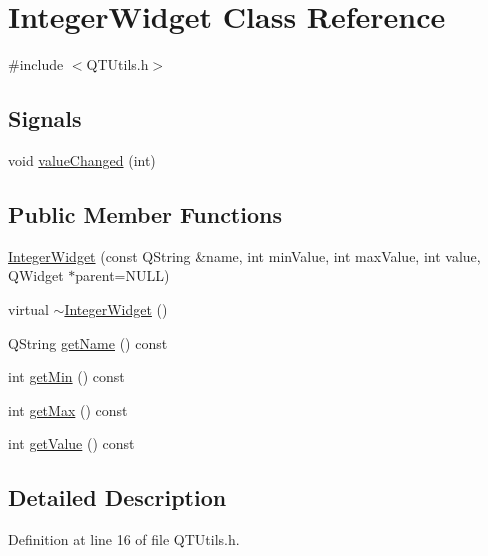\hypertarget{class_integer_widget}{
\section{IntegerWidget Class Reference}
\label{class_integer_widget}
}


{\ttfamily \#include $<$QTUtils.h$>$}

\subsection*{Signals}
\begin{DoxyCompactItemize}
\item 
void \hyperlink{class_integer_widget_aa03e99936c5ddade17ae797559bfbfb7}{valueChanged} (int)
\end{DoxyCompactItemize}
\subsection*{Public Member Functions}
\begin{DoxyCompactItemize}
\item 
\hyperlink{class_integer_widget_a0b1d0695d1359eb1a2eb768ea359a23a}{IntegerWidget} (const QString \&name, int minValue, int maxValue, int value, QWidget $\ast$parent=NULL)
\item 
virtual \hyperlink{class_integer_widget_a50245cc886b444e8585842e570b58107}{$\sim$IntegerWidget} ()
\item 
QString \hyperlink{class_integer_widget_adda829561fc393642baad9c79f87d2ce}{getName} () const 
\item 
int \hyperlink{class_integer_widget_a4633ac1169debbc71cc8bcf79c9bf94c}{getMin} () const 
\item 
int \hyperlink{class_integer_widget_ae9bb5484dce29b772013b5327aabb185}{getMax} () const 
\item 
int \hyperlink{class_integer_widget_ab339eb21f363158e7c92a3832d8d9d38}{getValue} () const 
\end{DoxyCompactItemize}


\subsection{Detailed Description}


Definition at line 16 of file QTUtils.h.



